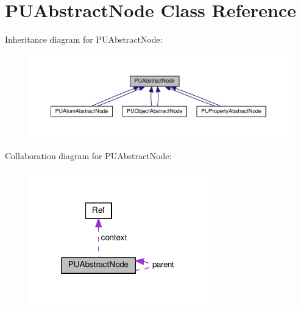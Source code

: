 \hypertarget{classPUAbstractNode}{}\section{P\+U\+Abstract\+Node Class Reference}
\label{classPUAbstractNode}


Inheritance diagram for P\+U\+Abstract\+Node\+:
\nopagebreak
\begin{figure}[H]
\begin{center}
\leavevmode
\includegraphics[width=350pt]{classPUAbstractNode__inherit__graph}
\end{center}
\end{figure}


Collaboration diagram for P\+U\+Abstract\+Node\+:
\nopagebreak
\begin{figure}[H]
\begin{center}
\leavevmode
\includegraphics[width=220pt]{classPUAbstractNode__coll__graph}
\end{center}
\end{figure}

